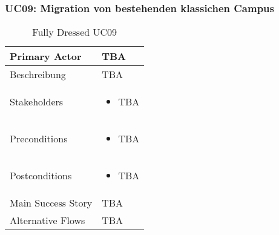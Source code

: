 \subsubsection{UC09: Migration von bestehenden klassichen Campus}
\begin{table}[H]
	\centering
	\begin{tabularx}{\textwidth}{l | X}
		Primary Actor   & TBA        \\
		\hline
		Beschreibung   & TBA  \\ 
		\hline
		Stakeholders       & 
		\begin{itemize}
			\item TBA
		\end{itemize} \\ 
		Preconditions      &
		\begin{itemize}	
			\item TBA
		\end{itemize}  \\
		\hline
		Postconditions     & 
		\begin{itemize}	
			\item TBA
		\end{itemize}  \\
		\hline
		Main Success Story & TBA
		\newline
		\\
		\hline
		Alternative Flows  & 
		TBA \newline
		\newline
	\end{tabularx}
	\caption{Fully Dressed UC09}
	\label{tab:UC09}
\end{table}

